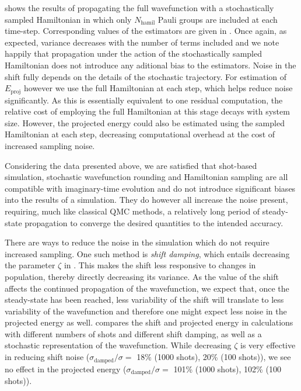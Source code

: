 \documentclass[%
 reprint,
 amsmath,amssymb,
 aps,
]{revtex4-2}
\begin{document}
 shows the results of propagating the full wavefunction with a stochastically sampled Hamiltonian in which only $N_\mathrm{hamil}$ Pauli groups are included at each time-step. Corresponding values of the estimators are given in . Once again, as expected, variance decreases with the number of terms included and we note happily that propagation under the action of the stochastically sampled Hamiltonian does not introduce any aditional bias to the estimators. Noise in the shift fully depends on the details of the stochastic trajectory. For estimation of $E_\mathrm{proj}$ however we use the full Hamiltonian at each step, which helps reduce noise significantly. As this is essentially equivalent to one residual computation, the relative cost of employing the full Hamiltonian at this stage decays with system size. However, the projected energy could also be estimated using the sampled Hamiltonian at each step, decreasing computational overhead at the cost of increased sampling noise.


Considering the data presented above, we are satisfied that shot-based simulation, stochastic wavefunction rounding and Hamiltonian sampling are all compatible with imaginary-time evolution and do not introduce significant biases into the results of a simulation. They do however all increase the noise present, requiring, much like classical QMC methods, a relatively long period of steady-state propagation to converge the desired quantities to the intended accuracy.


There are ways to reduce the noise in the simulation which do not require increased sampling. One such method is \textit{shift damping},\cite{Booth2009} which entails decreasing the parameter $\zeta$ in . This makes the shift less responsive to changes in population, thereby directly decreasing its variance. As the value of the shift affects the continued propagation of the wavefunction, we expect that, once the steady-state has been reached, less variability of the shift will translate to less variability of the wavefunction and therefore one might expect less noise in the projected energy as well.  compares the shift and projected energy in calculations with different numbers of shots and different shift damping, as well as a stochastic representation of the wavefunction. While decreasing $\zeta$ is very effective in reducing shift noise ($\sigma_\mathrm{damped}/\sigma =$ 18\% (1000 shots), 20\% (100 shots)), we see no effect in the projected energy ($\sigma_\mathrm{damped}/\sigma =$ 101\% (1000 shots), 102\% (100 shots)).
\end{document}
